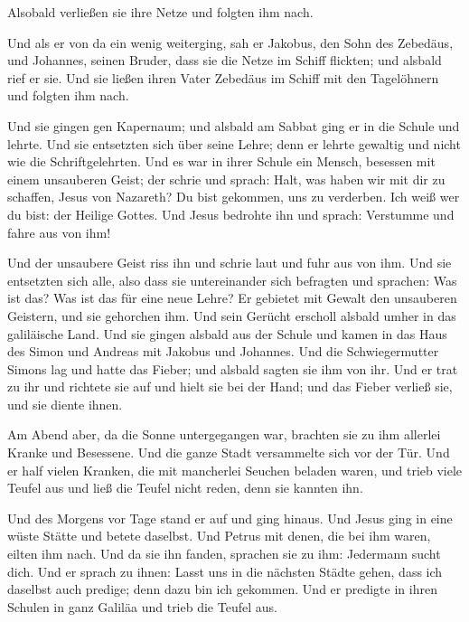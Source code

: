 Alsobald verließen sie ihre Netze und folgten ihm nach.

 Und als er von da ein wenig weiterging, sah er Jakobus,
den Sohn des Zebedäus, und Johannes, seinen Bruder, dass sie die Netze
im Schiff flickten; und alsbald rief er sie.  Und sie
ließen ihren Vater Zebedäus im Schiff mit den Tagelöhnern und folgten
ihm nach.

 Und sie gingen gen Kapernaum; und alsbald am Sabbat ging
er in die Schule und lehrte.  Und sie entsetzten sich
über seine Lehre; denn er lehrte gewaltig und nicht wie die
Schriftgelehrten.  Und es war in ihrer Schule ein Mensch,
besessen mit einem unsauberen Geist; der schrie  und
sprach: Halt, was haben wir mit dir zu schaffen, Jesus von Nazareth? Du
bist gekommen, uns zu verderben. Ich weiß wer du bist: der Heilige
Gottes.  Und Jesus bedrohte ihn und sprach: Verstumme und
fahre aus von ihm!

 Und der unsaubere Geist riss ihn und schrie laut und
fuhr aus von ihm.  Und sie entsetzten sich alle, also
dass sie untereinander sich befragten und sprachen: Was ist das? Was ist
das für eine neue Lehre? Er gebietet mit Gewalt den unsauberen Geistern,
und sie gehorchen ihm.  Und sein Gerücht erscholl alsbald
umher in das galiläische Land.  Und sie gingen alsbald
aus der Schule und kamen in das Haus des Simon und Andreas mit Jakobus
und Johannes.  Und die Schwiegermutter Simons lag und
hatte das Fieber; und alsbald sagten sie ihm von ihr. 
Und er trat zu ihr und richtete sie auf und hielt sie bei der Hand; und
das Fieber verließ sie, und sie diente ihnen.

 Am Abend aber, da die Sonne untergegangen war, brachten
sie zu ihm allerlei Kranke und Besessene.  Und die ganze
Stadt versammelte sich vor der Tür.  Und er half vielen
Kranken, die mit mancherlei Seuchen beladen waren, und trieb viele
Teufel aus und ließ die Teufel nicht reden, denn sie kannten ihn.

 Und des Morgens vor Tage stand er auf und ging hinaus.
Und Jesus ging in eine wüste Stätte und betete daselbst. 
Und Petrus mit denen, die bei ihm waren, eilten ihm nach.
 Und da sie ihn fanden, sprachen sie zu ihm: Jedermann
sucht dich.  Und er sprach zu ihnen: Lasst uns in die
nächsten Städte gehen, dass ich daselbst auch predige; denn dazu bin ich
gekommen.  Und er predigte in ihren Schulen in ganz
Galiläa und trieb die Teufel aus.

